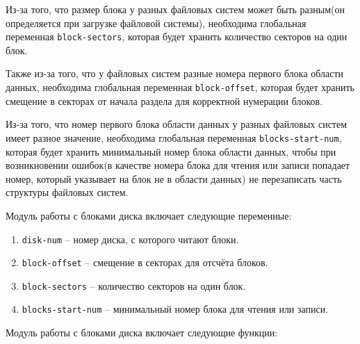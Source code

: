 Из-за того, что размер блока у разных файловых систем может быть разным(он определяется при загрузке файловой системы), необходима глобальная переменная \texttt{block-sectors}, которая будет хранить количество секторов на один блок.

Также из-за того, что у файловых систем разные номера первого блока области данных, необходима глобальная переменная \texttt{block-offset}, которая будет хранить смещение в секторах от начала раздела для корректной нумерации блоков.

Из-за того, что номер первого блока области данных у разных файловых систем имеет разное значение, необходима глобальная переменная \texttt{blocks-start-num}, которая будет хранить минимальный номер блока области данных, чтобы при возникновении ошибок(в качестве номера блока для чтения или записи попадает номер, который указывает на блок не в области данных) не перезаписать часть структуры файловых систем.

Модуль работы с блоками диска включает следующие переменные:

\begin{enumerate}
	\item \texttt{disk-num} -- номер диска, с которого читают блоки.
	\item \texttt{block-offset} -- смещение в секторах для отсчёта блоков.
	\item \texttt{block-sectors} -- количество секторов на один блок.
	\item \texttt{blocks-start-num} -- минимальный номер блока для чтения или записи.
\end{enumerate}

Модуль работы с блоками диска включает следующие функции:

